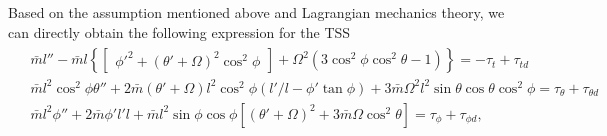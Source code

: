 \documentclass[3p]{elsarticle}
\theoremstyle{plain}
\theoremstyle{remark}
\begin{document}
Based on the assumption mentioned above and Lagrangian mechanics theory, we can directly obtain the following expression for the TSS~\cite{Sun2014304,Mantellato2015}
\begin{align}
\begin{split}
&\bar m l''-\bar m l\left\{\begin{bmatrix}\phi'^2+(\theta'+\Omega)^2\cos^2\phi\end{bmatrix}+\Omega^2(3\cos^2\phi\cos^2\theta-1)\right\}=-\tau_t+\tau_{td}\\
&\bar m l^2\cos^2\phi\theta''+2\bar m (\theta'+\Omega)l^2\cos^2\phi(l'/l-\phi'\tan\phi)+3\bar m \Omega^2l^2\sin\theta\cos\theta\cos^2\phi=\tau_\theta+\tau_{\theta d}\\
&\bar m l^2\phi''+2\bar m \phi'l'l+\bar m l^2\sin\phi\cos\phi\left[(\theta'+\Omega)^2+3\bar m \Omega\cos^2\theta\right]=\tau_\phi+\tau_{\phi d},\label{eq:dynamics 1}
\end{split}
\end{align}
\end{document}
